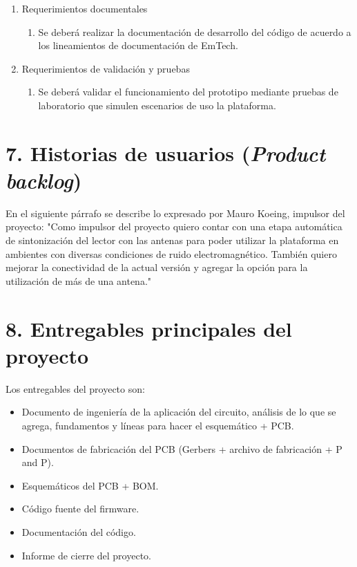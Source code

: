 \documentclass[
11pt, %
]{charter}
\begin{document}
\begin{enumerate}
	\item Requerimientos documentales
	\begin{enumerate}
			\item Se deberá realizar la documentación de desarrollo del código de acuerdo a los lineamientos de documentación de EmTech. 
			\end{enumerate}
			\item Requerimientos de validación y pruebas
	\begin{enumerate}
			\item Se deberá validar el funcionamiento del prototipo mediante pruebas de laboratorio que simulen escenarios de uso la plataforma.
			\end{enumerate}
\end{enumerate}



\section{7. Historias de usuarios (\textit{Product backlog})}
\label{sec:backlog}

En el siguiente párrafo se describe lo expresado por Mauro Koeing, impulsor del proyecto: "Como impulsor del proyecto quiero contar con una etapa automática de sintonización del lector con las antenas para poder utilizar la plataforma en ambientes con diversas condiciones de ruido electromagnético. También quiero mejorar la conectividad de la actual versión y agregar la opción para la utilización de más de una antena."


\section{8. Entregables principales del proyecto}
\label{sec:entregables}

Los entregables del proyecto son:

\begin{itemize}
	\item Documento de ingeniería de la aplicación del circuito, análisis de lo que se agrega, fundamentos y líneas para hacer el esquemático + PCB.
    \item Documentos de fabricación del PCB (Gerbers + archivo de fabricación + P and P).
    \item Esquemáticos del PCB + BOM.
	\item Código fuente del firmware.
	\item Documentación del código.
	\item Informe de cierre del proyecto.

\end{itemize}
\end{document}
